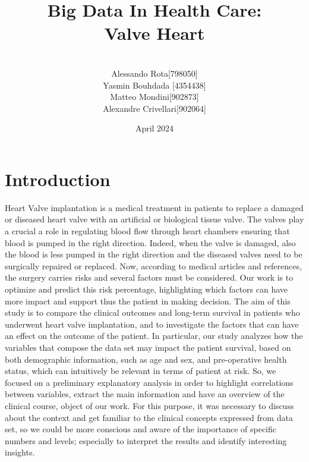 \documentclass[12pt,a4paper]{report}
\title{Big Data In Health Care: \\ Valve Heart}
\author{\\ \large Alessando Rota[798050] \vspace{0.5cm}\\  \large Yasmin Bouhdada [4354438] \vspace{0.5cm}\\ \large Matteo Mondini[902873] \vspace{0.5cm}\\ \large Alexandre Crivellari[902064]\vspace{0.5cm}\\}
\date{April 2024}
\begin{document}
\maketitle

\chapter{Introduction}
Heart Valve implantation is a medical treatment in patients to replace a damaged or diseased heart valve with an artificial or biological tissue valve. The valves play a crucial a role in regulating blood flow through heart chambers ensuring that blood is pumped in the right direction. Indeed, when the valve is damaged,  also the blood is less pumped in the right direction and the diseased valves need to be surgically repaired or replaced.  Now, according to medical articles and references, the surgery carries risks and several factors must be considered. Our work is to optimize and predict this risk percentage, highlighting which factors can have more impact and support thus the patient in making decision. The aim of this study is to compare the clinical outcomes and long-term survival in patients who underwent heart valve implantation, and to investigate the factors that can have an effect on the outcome of the patient. In particular, our study analyzes how the variables that compose the data set may impact the patient survival, based on both demographic information, such as age and sex, and pre-operative health status, which can intuitively be relevant in terms of patient at risk. So, we focused on a preliminary explanatory analysis in order to highlight correlations between variables, extract the main information and have an overview of the clinical course, object of our work.
For this purpose, it was necessary to discuss about the context and get familiar to the clinical concepts expressed from data set, so we could be more conscious and aware of the importance of specific numbers and levels; especially to interpret the results and identify interesting insights.



\newpage 
\end{document}
